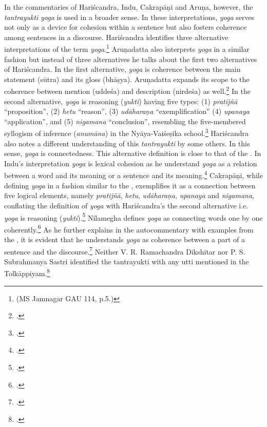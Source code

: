 In the commentaries of Hariścandra, Indu, Cakrapāṇi and Aruṇa, however, the \emph{tantrayukti} \emph{yoga} is used in a broader sense. In these interpretations, \emph{yoga} serves not only as a device for cohesion within a sentence but also fosters coherence among sentences in a discourse. Hariścandra identifies three alternative interpretations of the term \emph{yoga}.\footnote{ (MS Jamnagar GAU 114, p.5.)} 
Aruṇadatta also interprets \emph{yoga} in a similar fashion but instead of three alternatives he talks about the first two alternatives of Hariścandra. In the first alternative, \emph{yoga} is coherence between the main statement (sūtra) and its gloss (bhāṣya).
Aruṇadatta expands its scope to the coherence between mention (uddeśa) and description (nirdeśa) as well.\footnote{ .}  
In the second alternative, \emph{yoga} is reasoning (\emph{yukti}) having five types: (1) \emph{pratijñā} “proposition”, (2) \emph{hetu} “reason”, (3) \emph{udāharaṇa} “exemplification” (4) \emph{upanaya} “application”, and (5) \emph{nigamana} “conclusion”, resembling the five-membered syllogism of inference (\emph{anumāna}) in the Nyāya-Vaiśeṣika school.\footnote{ .}  
Hariścandra also notes a different understanding of this \emph{tantrayukti} by some others. In this sense, \emph{yoga} is connectedness. This alternative definition is close to that of the \SS. In Indu's interpretation \emph{yoga} is lexical cohesion as he understand \emph{yoga} as a relation between a word and its meaning or a sentence and its meaning.\footnote{ .} 
Cakrapāṇi, while defining \emph{yoga} in a fashion similar to the \SS, exemplifies it as a connection between five logical elements, namely \emph{pratijñā}, \emph{hetu}, \emph{udāharaṇa}, \emph{upanaya} and \emph{nigamana}, conflating the definition of \emph{yoga} with Hariścandra's the second alternative i.e. \emph{yoga} is reasoning (\emph{yukti}).\footnote{ .} 
Nīlamegha defines \emph{yoga} as connecting words one by one coherently.\footnote{.} As he further explains in the autocommentary with examples from the \AHS, it is evident that he understands \emph{yoga} as coherence between a part of a sentence and the discourse.\footnote{\dev{/} \cite[3]{muth-1976}.} 
Neither V. R. Ramachandra Dikshitar nor P. S. Subrahmanya Sastri identified the tantrayukti with any utti mentioned in the Tolkāppiyam.\footnote{\cite[84]{chev-2009}.} 

